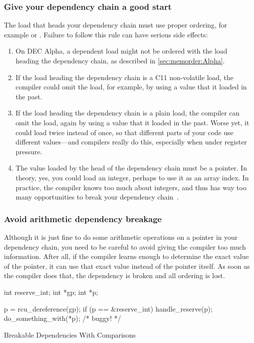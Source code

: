 \subsubsection{Give your dependency chain a good start}
The load that heads your dependency chain must use proper
ordering, for example  or .
Failure to follow this rule can have serious side effects:

\begin{enumerate}
\item	On DEC Alpha, a dependent load might not be ordered with
	the load heading the dependency chain, as described in
	\cref{sec:memorder:Alpha}.
\item	If the load heading the dependency chain is a
	C11 non-volatile  load,
	the compiler could omit the load, for example, by using a value
	that it loaded in the past.
\item	If the load heading the dependency chain is a plain load,
	the compiler can omit the load, again by using a value
	that it loaded in the past.
	Worse yet, it could load twice instead of once, so that
	different parts of your code use different values---and
	compilers really do this, especially when under register
	pressure.
\item	The value loaded by the head of the dependency chain must
	be a pointer.
	In theory, yes, you could load an integer, perhaps to use
	it as an array index.
	In practice, the compiler knows too much about integers,
	and thus has way too many opportunities to break your
	dependency chain~\cite{PaulEMcKennneyConsumeP0190R4}.
\end{enumerate}

\subsubsection{Avoid arithmetic dependency breakage}
Although it is just fine to do some arithmetic operations on a pointer in
your dependency chain, you need to be careful to avoid giving the
compiler too much information.
After all, if the compiler learns enough to determine the exact value
of the pointer, it can use that exact value instead of the pointer itself.
As soon as the compiler does that, the dependency is broken and all
ordering is lost.

\begin{listing}
\begin{fcvlabel}
\begin{VerbatimL}[commandchars=\\\[\]]
int reserve_int;
int *gp;
int *p;

p = rcu_dereference(gp);
if (p == &reserve_int)		\lnlbl[cmp]
	handle_reserve(p);	\lnlbl[handle]
do_something_with(*p); /* buggy! */
\end{VerbatimL}
\end{fcvlabel}
\caption{Breakable Dependencies With Comparisons}
\label{lst:memorder:Breakable Dependencies With Comparisons}
\end{listing}

